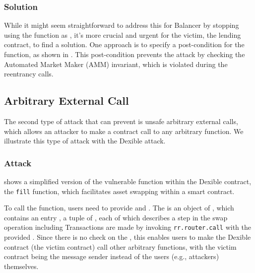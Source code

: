 \subsubsection{Solution} 
While it might seem straightforward to address this for Balancer by stopping using the  function as , it's more crucial and urgent for the victim, the lending contract, to find a solution. One approach is to specify a post-condition for the  function, as shown in . This post-condition prevents the attack by checking the Automated Market Maker (AMM) invariant, which is violated during the reentrancy calls.




\fi

\iffalse
\subsection{Arbitrary External Call}





The second type of attack that \lang can prevent is unsafe arbitrary external calls, 
which allows an attacker to make a contract call to any arbitrary function. 
We illustrate this type of attack with the Dexible attack.

\subsubsection{Attack} 
 shows a simplified version of the vulnerable function within the Dexible contract, 
the \texttt{fill} function,
which facilitates asset swapping within a smart contract. 

To call the  function, users need to provide  and . The   is an object of , 
which contains an entry , a tuple of , each of which describes a step in the swap operation including  
Transactions are made by invoking \texttt{rr.router.call} with the provided . Since there is no check on the , this enables users to make the Dexible contract (the victim contract) call other arbitrary functions, with the victim contract being the message sender instead of the users (e.g., attackers) themselves. 

